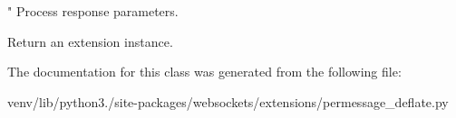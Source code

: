 \begin{DoxyVerb}"
Process response parameters.

Return an extension instance.\end{DoxyVerb}
 

The documentation for this class was generated from the following file\+:\begin{DoxyCompactItemize}
\item 
venv/lib/python3./site-\/packages/websockets/extensions/permessage\+\_\+deflate.\+py\end{DoxyCompactItemize}
